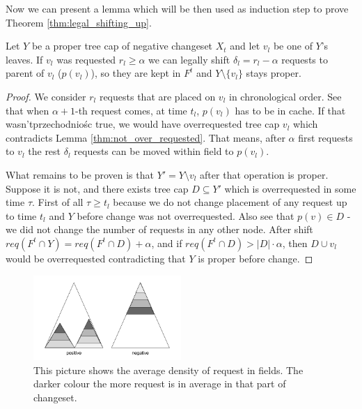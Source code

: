 Now we can present a lemma which will be then used as induction step to prove 
Theorem \ref{thm:legal_shifting_up}.
\begin{lemma}
 Let $Y$ be a proper tree cap of negative changeset $X_t$ and let $v_l$ be one 
of $Y$'s leaves. If $v_l$ was requested $r_l \geq \alpha$ we can legally shift  
$\delta_l = r_l - \alpha$ requests to parent of $v_l$ ($p(v_l)$), so they are 
kept in $F^t$ and $Y \setminus \{v_l\}$ stays proper. 
\end{lemma}
\begin{proof}
We consider $r_l$ requests that are placed on $v_l$ in chronological order. See 
that when $\alpha + 1$-th request comes, at time $t_l$, $p(v_l)$ has to be in 
cache. If that wasn'tprzechodniośc true, we would have overrequested tree cap 
${v_l}$ which 
contradicts Lemma \ref{thm:not_over_requested}. That means, after $\alpha$ first 
requests to $v_l$ the rest $\delta_l$ requests can be moved within field to 
$p(v_l)$.

What remains to be proven is that $Y' = Y \setminus {v_l}$ after that operation 
is proper. Suppose it is not, and there exists tree cap $D \subseteq Y'$ which 
is overrequested in some time $\tau$. First of all $\tau \geq t_l$ because we 
do not change placement of any request up to time $t_l$ and $Y$ before change 
was not overrequested. Also see that $p(v) \in D$ - we did not change the 
number of requests in any other node. After shift $req(F^t \cap Y) = req(F^t 
\cap D) + \alpha$, and if $req(F^t \cap D) > |D| \cdot \alpha$, then $D \cup 
v_l$ would be overrequested contradicting that $Y$ is proper before change.
\end{proof}
\begin{figure}
\vspace{-20pt}
 \begin{center}
  \includegraphics[width=0.5\textwidth]{density_pic.png}
\end{center}
\caption{This picture shows the average density of request in fields. The 
darker colour the more request is in average in that part of changeset.}
\vspace{-20pt}
\label{fig:density}
\end{figure}

